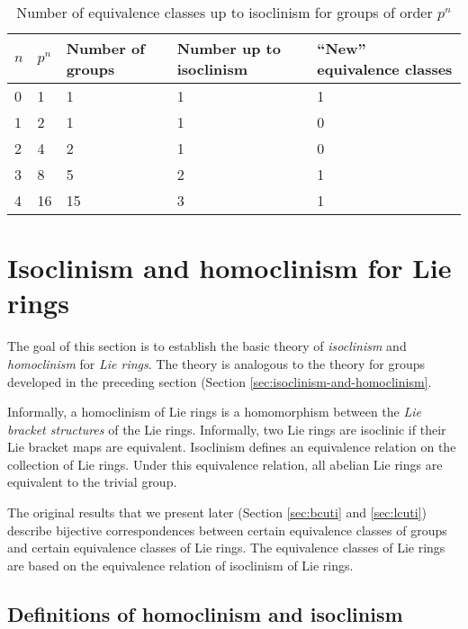 \begin{small}
\begin{table}[htbp]
\caption{Number of equivalence classes up to isoclinism for groups of
  order $p^n$}\label{T3}
\begin{tabular}{|l|l|l|l|l|}
  \hline
  $n$ & $p^n$ & Number of groups & Number up to isoclinism & ``New'' equivalence classes\\
  \hline
  0 & 1 & 1 & 1 & 1\\\hline
  1 & 2 & 1 & 1 & 0\\\hline
  2 & 4 & 2 & 1 & 0\\\hline
  3 & 8 & 5 & 2 & 1\\\hline
  4 &16 &15 & 3 & 1\\\hline
\end{tabular}
\end{table}
\end{small}

\section{Isoclinism and homoclinism for Lie rings}\label{sec:isoclinism-and-homoclinism-lie}

The goal of this section is to establish the basic theory of {\em
  isoclinism} and {\em homoclinism} for {\em Lie rings}. The theory is
analogous to the theory for groups developed in the preceding section
(Section \ref{sec:isoclinism-and-homoclinism}. 

Informally, a homoclinism of Lie rings is a homomorphism between the
{\em Lie bracket structures} of the Lie rings. Informally, two Lie
rings are isoclinic if their Lie bracket maps are
equivalent. Isoclinism defines an equivalence relation on the
collection of Lie rings. Under this equivalence relation, all abelian
Lie rings are equivalent to the trivial group.

The original results that we present later (Section \ref{sec:bcuti}
and \ref{sec:lcuti}) describe bijective correspondences between
certain equivalence classes of groups and certain equivalence classes
of Lie rings. The equivalence classes of Lie rings are based on the
equivalence relation of isoclinism of Lie rings.

\subsection{Definitions of homoclinism and isoclinism}\label{sec:isoclinism-definition-lie}

